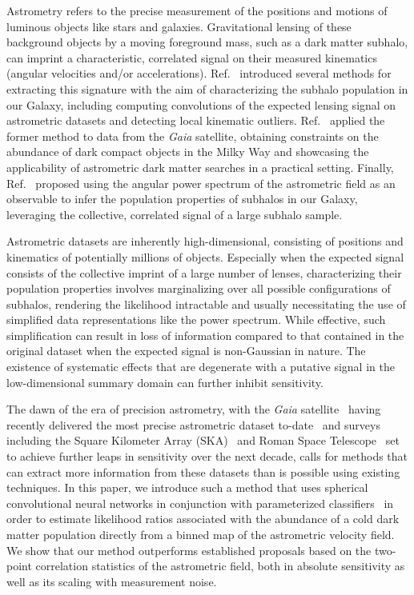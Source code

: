 \documentclass[preprint]{article}
\begin{document}
Astrometry refers to the precise measurement of the positions and motions of luminous objects like stars and galaxies. Gravitational lensing of these background objects by a moving foreground mass, such as a dark matter subhalo, can imprint a characteristic, correlated signal on their measured kinematics (angular velocities and/or accelerations). Ref.~\cite{VanTilburg:2018ykj} introduced several methods for extracting this signature with the aim of characterizing the subhalo population in our Galaxy, including computing convolutions of the expected lensing signal on astrometric datasets and detecting local kinematic outliers. Ref.~\cite{Mondino:2020rkn} applied the former method to data from the \emph{Gaia} satellite, obtaining constraints on the abundance of dark compact objects in the Milky Way and showcasing the applicability of astrometric dark matter searches in a practical setting. Finally, Ref.~\cite{Mishra-Sharma:2020ynk} proposed using the angular power spectrum of the astrometric field as an observable to infer the population properties of subhalos in our Galaxy, leveraging the collective, correlated signal of a large subhalo sample. 

Astrometric datasets are inherently high-dimensional, consisting of positions and kinematics of potentially millions of objects. Especially when the expected signal consists of the collective imprint of a large number of lenses, characterizing their population properties involves marginalizing over all possible configurations of subhalos, rendering the likelihood intractable and usually necessitating the use of simplified data representations like the power spectrum. While effective, such simplification can result in loss of information compared to that contained in the original dataset when the expected signal is non-Gaussian in nature. The existence of systematic effects that are degenerate with a putative signal in the low-dimensional summary domain can further inhibit sensitivity. 

The dawn of the era of precision astrometry, with the \emph{Gaia} satellite~\cite{2016A&A...595A...1G} having recently delivered the most precise astrometric dataset to-date~\cite{2018A&A...616A...1G,2018A&A...616A...2L,2021A&A...649A...1G} and surveys including the Square Kilometer Array (SKA)~\cite{Fomalont:2004hr,Jarvis:2015tqa} and Roman Space Telescope~\cite{2019JATIS...5d4005W} set to achieve further leaps in sensitivity over the next decade, calls for methods that can extract more information from these datasets than is possible using existing techniques. In this paper, we introduce such a method that uses spherical convolutional neural networks in conjunction with parameterized classifiers~\cite{Cranmer:2015bka,Baldi:2016fzo} in order to estimate likelihood ratios associated with the abundance of a cold dark matter population directly from a binned map of the astrometric velocity field. 
We show that our method outperforms established proposals based on the two-point correlation statistics of the astrometric field, both in absolute sensitivity as well as its scaling with measurement noise.
\end{document}
